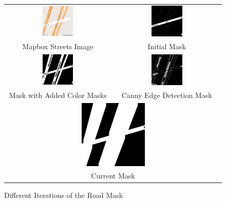 \begin{figure}[htbp]
  \centering{}
  \begin{tabular}{cc}
    \includegraphics[width=0.30\textwidth]{images/streets.png} &
    \includegraphics[width=0.30\textwidth]{images/old_mask.png} \\
    Mapbox Streets Image & Initial Mask \\
    \includegraphics[width=0.30\textwidth]{images/new_mask.png} &
    \includegraphics[width=0.30\textwidth]{images/canny_edge_mask.png} \\
    Mask with Added Color Masks & Canny Edge Detection Mask \\
    \multicolumn{2}{c}{\includegraphics[width=0.30\textwidth]{images/current_mask.png}} \\
    \multicolumn{2}{c}{Current Mask}
  \end{tabular}
  \caption{Different Iterations of the Road Mask}
  \label{fig:mask_iterations}
\end{figure}

